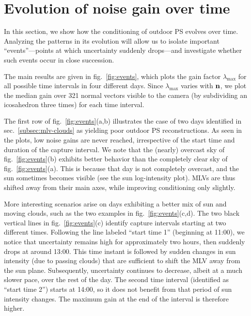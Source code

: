 

\section{Evolution of noise gain over time}

In this section, we show how the conditioning of outdoor PS evolves over time. Analyzing the patterns in its evolution will allow us to isolate important ``events''---points at which uncertainty suddenly drops---and investigate whether such events occur in close succession.

The main results are given in fig.~\ref{fig:events}, which plots the gain factor $\lambda_{\max}$ for all possible time intervals in four different days. Since $\lambda_{\max}$ varies with ${\bf n}$, we plot the median gain over 321 normal vectors visible to the camera (by subdividing an icosahedron three times) for each time interval.

The first row of fig.~\ref{fig:events}(a,b) illustrates the case of two days identified in sec.~\ref{subsec:mlv-clouds} as yielding poor outdoor PS reconstructions. As seen in the plots, low noise gains are never reached, irrespective of the start time and duration of the capture interval. We note that the (nearly) overcast sky of fig.~\ref{fig:events}(b) exhibits better behavior than the completely clear sky of fig.~\ref{fig:events}(a). This is because that day is not completely overcast, and the sun sometimes becomes visible (see the sun log-intensity plot). MLVs are thus shifted away from their main axes, while improving conditioning only slightly.

More interesting scenarios arise on days exhibiting a better mix of sun and moving clouds, such as the two examples in fig.~\ref{fig:events}(c,d). The two black vertical lines in fig.~\ref{fig:events}(c) identify capture intervals starting at two different times. Following the line labeled ``start time 1'' (beginning at 11:00), we notice that uncertainty remains high for approximately two hours, then suddenly drops at around 13:00. This time instant is followed by sudden changes in sun intensity (due to passing clouds) that are sufficient to shift the MLV away from the sun plane. Subsequently, uncertainty continues to decrease, albeit at a much slower pace, over the rest of the day. The second time interval (identified as ``start time 2'') starts at 14:00, so it does not benefit from that period of sun intensity changes. The maximum gain at the end of the interval is therefore higher. 

